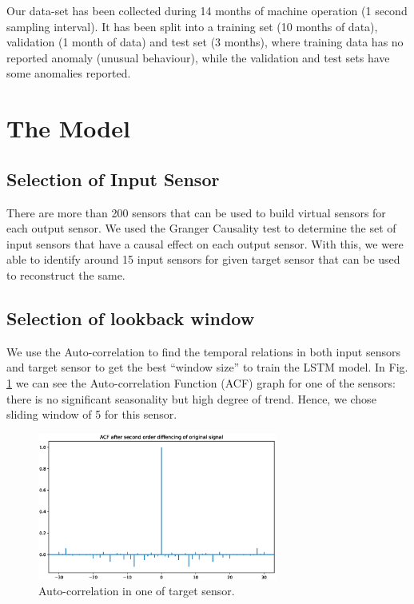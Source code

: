 \documentclass[runningheads]{llncs}
\begin{document}
Our data-set has been collected during 14 months of machine operation (1 second sampling interval).
It has been split into a training set (10 months of data), validation (1 month of data) and test set (3 months), where training data has no reported anomaly (unusual behaviour), while the validation and test sets have some anomalies reported. 




\section{The Model}
\subsection{Selection of Input Sensor}
There are more than 200 sensors that can be used to build virtual sensors for each output sensor. We used the Granger Causality \cite{granger1969,rosol2022} test to determine the set of input sensors that have a causal effect on each output sensor. With this, we were able to identify around 15 input sensors for given target sensor that can be used to reconstruct the same.

\subsection{Selection of lookback window } 
We use the Auto-correlation to find the temporal relations in both input sensors and target sensor to get the best ``window size'' to train the LSTM model. 
In Fig. \ref{auto-correlation} we can see the Auto-correlation Function (ACF) graph for one of the sensors: there is no significant seasonality but high degree of trend. Hence, we chose sliding window of 5 for this sensor. 

\begin{figure}[t]
\centering
\includegraphics[width=0.7\textwidth]{acf.eps}
\caption{Auto-correlation in one of target sensor.} \label{auto-correlation}
\end{figure}
\end{document}
